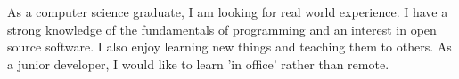 

\begin{cvparagraph}

As a computer science graduate, I am looking for real world experience. 
I have a strong knowledge of the fundamentals of programming and an interest in open source software. 
I also enjoy learning new things and teaching them to others. 
As a junior developer, I would like to learn 'in office' rather than remote.

\end{cvparagraph}
